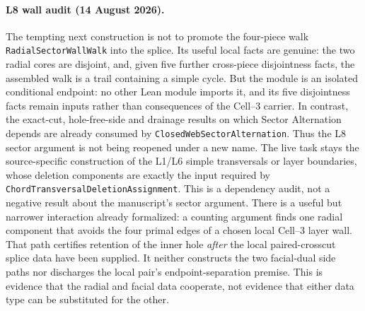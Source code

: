 \documentclass[11pt]{article}
\theoremstyle{definition}
\begin{document}
\paragraph{L8 wall audit (14 August 2026).}  The tempting next construction
is not to promote the four-piece walk
\texttt{RadialSectorWallWalk} into the splice.  Its useful local facts are
genuine: the two radial cores are disjoint, and, given five further
cross-piece disjointness facts, the assembled walk is a trail containing a
simple cycle.  But the module is an isolated conditional endpoint: no other
Lean module imports it, and its five disjointness facts remain inputs rather
than consequences of the Cell--3 carrier.  In contrast, the exact-cut,
hole-free-side and drainage results on which Sector Alternation depends are
already consumed by \texttt{ClosedWebSectorAlternation}.  Thus the L8
sector argument is not being reopened under a new name.  The live task stays
the source-specific construction of the L1/L6 simple transversals or layer
boundaries, whose deletion components are exactly the input required by
\texttt{ChordTransversalDeletionAssignment}.  This is a dependency audit,
not a negative result about the manuscript's sector argument.
There is a useful but narrower interaction already formalized: a counting
argument finds one radial component that avoids the four primal edges of a
chosen local Cell--3 layer wall.  That path certifies retention of the inner
hole \emph{after} the local paired-crosscut splice data have been supplied.
It neither constructs the two facial-dual side paths nor discharges the local
pair's endpoint-separation premise.  This is evidence that the radial and
facial data cooperate, not evidence that either data type can be substituted
for the other.
\end{document}
